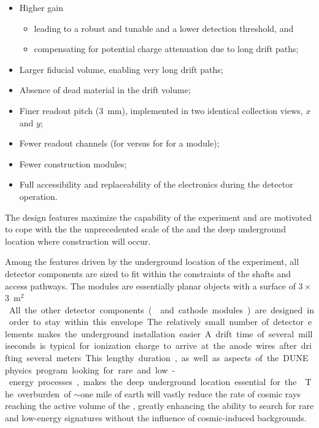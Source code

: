 
\begin{itemize}
\item Higher gain
\begin{itemize}
\item  leading to a robust and tunable  and a lower detection threshold, and
\item  compensating for potential charge attenuation due to long drift paths; 
\end{itemize}
\item  Larger fiducial volume, enabling very long drift paths;
\item  Absence of dead material in the \lar drift volume;
\item  Finer readout pitch (\SI{3}{mm}), implemented in two identical collection views, $x$ and $y$;
\item  Fewer readout channels (\dpnumcrpch for \dual versus \spnumch for \single for a  \nominalmodsize module); 
\item  Fewer construction modules;
\item  Full accessibility and replaceability of the  electronics during the detector operation.
\end{itemize}

 The \dual design features maximize the capability of the experiment and are motivated to cope with the the unprecedented scale of the  and the deep underground location where construction will occur.

Among the features driven by the underground location of the experiment, all detector components are sized to fit within the constraints of the \surf shafts and access pathways. The  modules are essentially planar objects with a surface of \num{3}\,$\times$\,\SI{3}{m$^2$}. All the other detector %
components ( and cathode modules) are %
designed in order to stay within this envelope. The relatively small number of detector elements makes the underground installation easier.

A drift time of several milliseconds is typical for ionization charge to arrive at the anode wires after drifting several meters.  This lengthy duration, as well as aspects of the DUNE physics program looking for rare and low-energy processes, makes the deep underground location essential for the .  The overburden of $\sim$one mile of earth will vastly reduce the rate of cosmic rays reaching the active volume of the , greatly enhancing the ability to search for rare and low-energy signatures without the influence of cosmic-induced backgrounds.  





